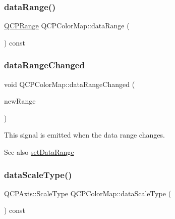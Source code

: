 \subsubsection{\texorpdfstring{data\+Range()}{dataRange()}}
{\footnotesize\ttfamily \hyperlink{class_q_c_p_range}{Q\+C\+P\+Range} Q\+C\+P\+Color\+Map\+::data\+Range (\begin{DoxyParamCaption}{ }\end{DoxyParamCaption}) const\hspace{0.3cm}{\ttfamily [inline]}}

\mbox{\label{class_q_c_p_color_map_a83ae5be3903da493f732e1a5c14fd807}} 
\subsubsection{\texorpdfstring{data\+Range\+Changed}{dataRangeChanged}}
{\footnotesize\ttfamily void Q\+C\+P\+Color\+Map\+::data\+Range\+Changed (\begin{DoxyParamCaption}\item[{const \hyperlink{class_q_c_p_range}{Q\+C\+P\+Range} \&}]{new\+Range }\end{DoxyParamCaption})\hspace{0.3cm}{\ttfamily [signal]}}

This signal is emitted when the data range changes.

\begin{DoxySeeAlso}{See also}
\hyperlink{class_q_c_p_color_map_a980b42837821159786a85b4b7dcb8774}{set\+Data\+Range} 
\end{DoxySeeAlso}
\mbox{\label{class_q_c_p_color_map_ab796f2dccc90fb7a354b6732c33ec9be}} 
\subsubsection{\texorpdfstring{data\+Scale\+Type()}{dataScaleType()}}
{\footnotesize\ttfamily \hyperlink{class_q_c_p_axis_a36d8e8658dbaa179bf2aeb973db2d6f0}{Q\+C\+P\+Axis\+::\+Scale\+Type} Q\+C\+P\+Color\+Map\+::data\+Scale\+Type (\begin{DoxyParamCaption}{ }\end{DoxyParamCaption}) const\hspace{0.3cm}{\ttfamily [inline]}}

